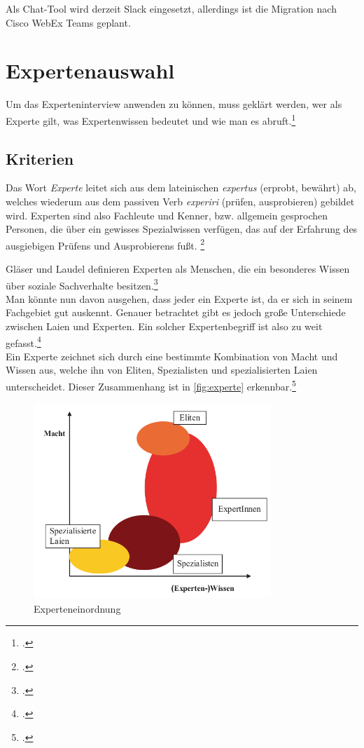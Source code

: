 Als Chat-Tool wird derzeit Slack eingesetzt, allerdings ist die Migration nach Cisco WebEx Teams geplant. 


\section{Expertenauswahl}
Um das Experteninterview anwenden zu können, muss geklärt werden, wer als Experte gilt, was Expertenwissen bedeutet und wie man es abruft.\footcite[Vgl.][6\psq]{Bogner_2014_Interview}

\subsection{Kriterien}
Das Wort \textit{Experte} leitet sich aus dem lateinischen \textit{expertus} (erprobt, bewährt) ab, welches wiederum aus dem passiven Verb \textit{experiri} (prüfen, ausprobieren) gebildet wird. Experten sind also Fachleute und Kenner, bzw. allgemein gesprochen Personen, die über ein gewisses Spezialwissen verfügen, das auf der Erfahrung des ausgiebigen Prüfens und Ausprobierens fußt. \footcite[Vgl.][9]{Bogner_2014_Interview}

Gläser und Laudel definieren Experten als Menschen, die ein besonderes Wissen über soziale Sachverhalte besitzen.\footcite[Vgl.][12]{Glaeser_2010_Inhaltsanalyse}\\
Man könnte nun davon ausgehen, dass jeder ein Experte ist, da er sich in seinem Fachgebiet gut auskennt. Genauer betrachtet  gibt es jedoch große Unterschiede zwischen Laien und Experten. Ein solcher Expertenbegriff ist also zu weit gefasst.\footcite[Vgl.][10\psq]{Bogner_2014_Interview}\\
Ein Experte zeichnet sich durch eine bestimmte Kombination von Macht und Wissen aus, welche ihn von Eliten, Spezialisten und spezialisierten Laien unterscheidet. Dieser Zusammenhang ist in  \autoref{fig:experte} erkennbar.\footcite[Vgl.][o. \pno]{Littig_2008}

\begin{figure}[H]
  \centering
  \includegraphics[width=0.8\textwidth]{Anhang/Experte}
  \caption{Experteneinordnung}
\label{fig:experte}
\end{figure}


